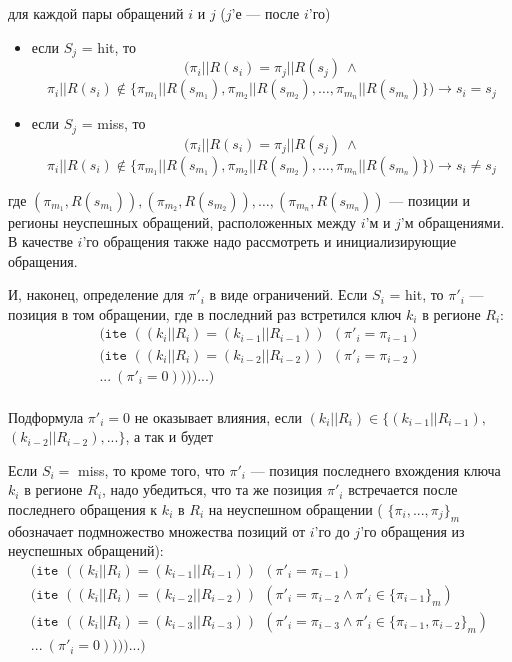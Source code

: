 для каждой пары обращений $i$ и $j$ ($j$'е --- после $i$'го)
\begin{itemize}
    \item если $S_j$ = hit, то $$(\pi_i||R(s_i) = \pi_j||R(s_j)~\wedge$$ $$\pi_i||R(s_i) \notin \{\pi_{m_1}||R(s_{m_1}), \pi_{m_2}||R(s_{m_2}), \dots, \pi_{m_n}||R(s_{m_n})\}) \rightarrow s_i = s_j$$
    \item если $S_j$ = miss, то $$(\pi_i||R(s_i) = \pi_j||R(s_j)~\wedge$$ $$\pi_i||R(s_i) \notin \{\pi_{m_1}||R(s_{m_1}), \pi_{m_2}||R(s_{m_2}), \dots, \pi_{m_n}||R(s_{m_n})\}) \rightarrow s_i \neq s_j$$
\end{itemize}
где $(\pi_{m_1},R(s_{m_1})), (\pi_{m_2},R(s_{m_2})), \dots, (\pi_{m_n},R(s_{m_n}))$ --- позиции и регионы неуспешных обращений,
расположенных между $i$'м и $j$'м обращениями. В качестве $i$'го обращения также надо рассмотреть и инициализирующие обращения.


И, наконец, определение для $\pi'_i$ в виде ограничений. Если $S_i$ = hit, то  $\pi'_i$ --- позиция в том обращении, где в последний раз встретился ключ $k_i$ в регионе $R_i$:
$$
\begin{array}{l}
\texttt{(ite~} ((k_i||R_i) = (k_{i-1}||R_{i-1})) ~~ (\pi'_i = \pi_{i-1})\\
\texttt{(ite~} ((k_i||R_i) = (k_{i-2}||R_{i-2})) ~~ (\pi'_i = \pi_{i-2})\\
... ~(\pi'_i = 0)\texttt{)))...)}\\
\end{array}
$$

Подформула $\pi'_i = 0$ не оказывает влияния, если $(k_i||R_i) \in \{(k_{i-1}||R_{i-1}),$ $(k_{i-2}||R_{i-2}), ... \}$, а так и будет

Если $S_i = $ miss, то кроме того, что $\pi'_i$ --- позиция последнего вхождения ключа $k_i$ в регионе $R_i$, надо убедиться, что та же позиция $\pi'_i$ встречается после последнего обращения к $k_i$ в $R_i$ на неуспешном обращении ( $\{\pi_i, ..., \pi_j\}_m$ обозначает подмножество множества позиций от $i$'го до $j$'го обращения из неуспешных обращений):
$$
\begin{array}{l}
\texttt{(ite~} ((k_i||R_i) = (k_{i-1}||R_{i-1})) ~~ (\pi'_i = \pi_{i-1})\\
\texttt{(ite~} ((k_i||R_i) = (k_{i-2}||R_{i-2})) ~~ (\pi'_i = \pi_{i-2} \wedge \pi'_i \in \{\pi_{i-1}\}_m)\\
\texttt{(ite~} ((k_i||R_i) = (k_{i-3}||R_{i-3})) ~~ (\pi'_i = \pi_{i-3} \wedge \pi'_i \in \{\pi_{i-1}, \pi_{i-2}\}_m)\\
... ~(\pi'_i = 0)\texttt{)))...)}\\
\end{array}
$$

